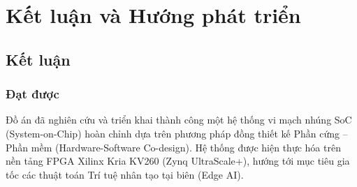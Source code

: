 \chapter{Kết luận và Hướng phát triển}
\label{chp:conclusion}

\section{Kết luận}

\subsection{Đạt được}
Đồ án đã nghiên cứu và triển khai thành công một hệ thống vi mạch nhúng SoC (System-on-Chip) hoàn chỉnh dựa trên phương pháp đồng thiết kế Phần cứng -- Phần mềm (Hardware-Software Co-design). Hệ thống được hiện thực hóa trên nền tảng FPGA Xilinx Kria KV260 (Zynq UltraScale+), hướng tới mục tiêu gia tốc các thuật toán Trí tuệ nhân tạo tại biên (Edge AI).

